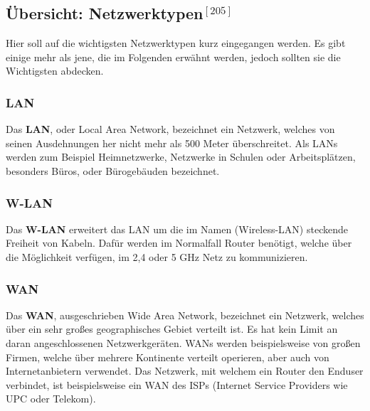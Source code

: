 \documentclass[12pt,a4paper]{report}
\begin{document}
\begin{onehalfspace}
\subsection*{Übersicht: Netzwerktypen$^{[205]}$}
Hier soll auf die wichtigsten Netzwerktypen kurz eingegangen werden. Es gibt einige mehr als jene, die im Folgenden erwähnt werden, jedoch sollten sie die Wichtigsten abdecken.
\subsubsection{LAN}
Das \textbf{LAN}, oder Local Area Network, bezeichnet ein Netzwerk, welches von seinen Ausdehnungen her nicht mehr als 500 Meter überschreitet. Als LANs werden zum Beispiel Heimnetzwerke, Netzwerke in Schulen oder Arbeitsplätzen, besonders Büros, oder Bürogebäuden bezeichnet.
\subsubsection{W-LAN}
Das \textbf{W-LAN} erweitert das LAN um die im Namen (Wireless-LAN) steckende Freiheit von Kabeln. Dafür werden im Normalfall Router benötigt, welche über die Möglichkeit verfügen, im 2,4 oder 5 GHz Netz zu kommunizieren.
\subsubsection{WAN}
Das \textbf{WAN}, ausgeschrieben Wide Area Network, bezeichnet ein Netzwerk, welches über ein sehr großes geographisches Gebiet verteilt ist. Es hat kein Limit an daran angeschlossenen Netzwerkgeräten. WANs werden beispielsweise von großen Firmen, welche über mehrere Kontinente verteilt operieren, aber auch von Internetanbietern verwendet. Das Netzwerk, mit welchem ein Router den Enduser verbindet, ist beispielsweise ein WAN des ISPs (Internet Service Providers wie UPC oder Telekom). 

\end{onehalfspace}
\end{document}
